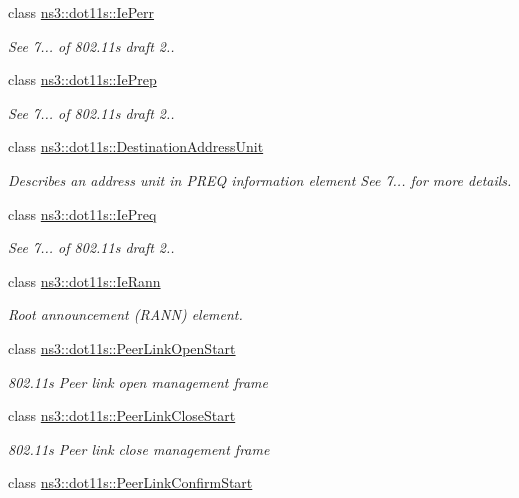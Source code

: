\begin{DoxyCompactItemize}
class \hyperlink{classns3_1_1dot11s_1_1IePerr}{ns3\+::dot11s\+::\+Ie\+Perr}
\begin{DoxyCompactList}\small\item\em See 7... of 802.\+11s draft 2.. \end{DoxyCompactList}\item 
class \hyperlink{classns3_1_1dot11s_1_1IePrep}{ns3\+::dot11s\+::\+Ie\+Prep}
\begin{DoxyCompactList}\small\item\em See 7... of 802.\+11s draft 2.. \end{DoxyCompactList}\item 
class \hyperlink{classns3_1_1dot11s_1_1DestinationAddressUnit}{ns3\+::dot11s\+::\+Destination\+Address\+Unit}
\begin{DoxyCompactList}\small\item\em Describes an address unit in P\+R\+EQ information element See 7... for more details. \end{DoxyCompactList}\item 
class \hyperlink{classns3_1_1dot11s_1_1IePreq}{ns3\+::dot11s\+::\+Ie\+Preq}
\begin{DoxyCompactList}\small\item\em See 7... of 802.\+11s draft 2.. \end{DoxyCompactList}\item 
class \hyperlink{classns3_1_1dot11s_1_1IeRann}{ns3\+::dot11s\+::\+Ie\+Rann}
\begin{DoxyCompactList}\small\item\em Root announcement (R\+A\+NN) element. \end{DoxyCompactList}\item 
class \hyperlink{classns3_1_1dot11s_1_1PeerLinkOpenStart}{ns3\+::dot11s\+::\+Peer\+Link\+Open\+Start}
\begin{DoxyCompactList}\small\item\em 802.\+11s Peer link open management frame \end{DoxyCompactList}\item 
class \hyperlink{classns3_1_1dot11s_1_1PeerLinkCloseStart}{ns3\+::dot11s\+::\+Peer\+Link\+Close\+Start}
\begin{DoxyCompactList}\small\item\em 802.\+11s Peer link close management frame \end{DoxyCompactList}\item 
class \hyperlink{classns3_1_1dot11s_1_1PeerLinkConfirmStart}{ns3\+::dot11s\+::\+Peer\+Link\+Confirm\+Start}

\end{DoxyCompactItemize}
